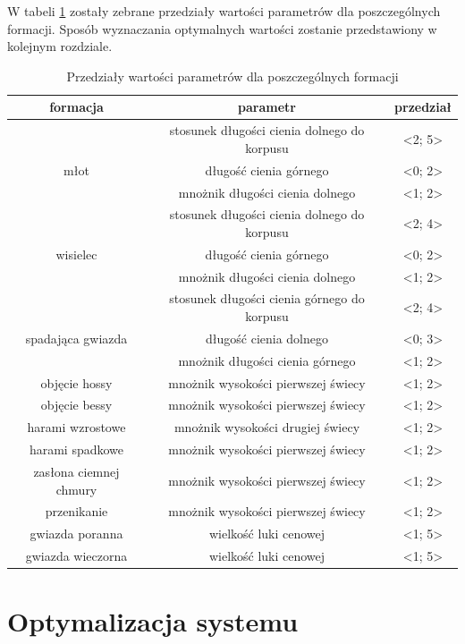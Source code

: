 \documentclass[pdflatex,11pt]{aghdpl}
\begin{document}
W tabeli \ref{parametry_przedzialy} zostały zebrane przedziały wartości parametrów dla poszczególnych formacji. Sposób wyznaczania optymalnych wartości zostanie przedstawiony w kolejnym rozdziale.  
\begin{table}[H]
\caption{Przedziały wartości parametrów dla poszczególnych formacji}
\begin{center}
\begin{tabular}{|c|c|c|}
\hline 
formacja & parametr & przedział \\
\hline
 & stosunek długości cienia dolnego do korpusu & <2; 5>\\
młot & długość cienia górnego & <0; 2>\\
& mnożnik długości cienia dolnego & <1; 2>\\
\hline
 & stosunek długości cienia dolnego do korpusu & <2; 4>\\
wisielec & długość cienia górnego & <0; 2>\\
& mnożnik długości cienia dolnego & <1; 2>\\
\hline
 & stosunek długości cienia górnego do korpusu & <2; 4>\\
spadająca gwiazda & długość cienia dolnego & <0; 3>\\
& mnożnik długości cienia górnego & <1; 2>\\
\hline
objęcie hossy & mnożnik wysokości pierwszej świecy & <1; 2>\\
\hline
objęcie bessy & mnożnik wysokości pierwszej świecy & <1; 2>\\
\hline
harami wzrostowe & mnożnik wysokości drugiej świecy & <1; 2>\\
\hline
harami spadkowe & mnożnik wysokości pierwszej świecy & <1; 2>\\
\hline
zasłona ciemnej chmury & mnożnik wysokości pierwszej świecy & <1; 2>\\
\hline
przenikanie & mnożnik wysokości pierwszej świecy & <1; 2>\\
\hline
gwiazda poranna & wielkość luki cenowej & <1; 5>\\
\hline
gwiazda wieczorna & wielkość luki cenowej & <1; 5>\\
\hline
\end{tabular} 

\label{parametry_przedzialy}
\end{center}
\end{table}

\chapter{Optymalizacja systemu}
\label{chap:optymalizacja}
\end{document}
